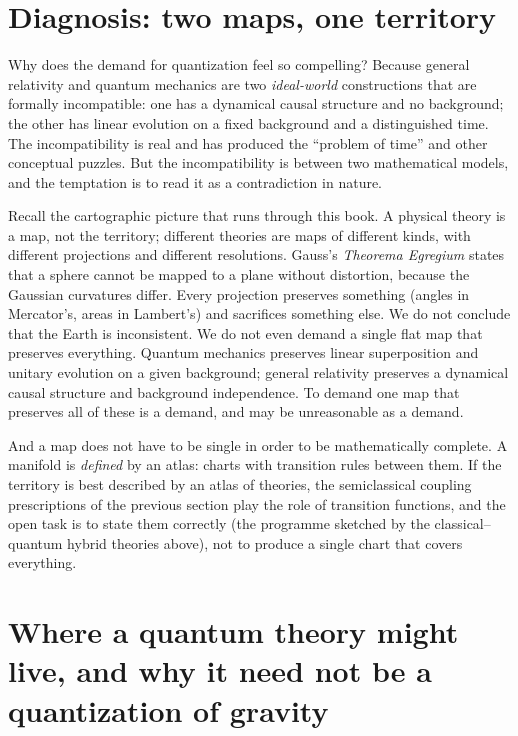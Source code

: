\section{Diagnosis: two maps, one territory}
\label{sec:maps}

Why does the demand for quantization feel so compelling? Because
general relativity and quantum mechanics are two \emph{ideal-world}
constructions that are formally incompatible: one has a dynamical
causal structure and no background; the other has linear evolution on a
fixed background and a distinguished time. The incompatibility is real
and has produced the ``problem of time'' and other conceptual puzzles.
But the incompatibility is between two mathematical models, and the
temptation is to read it as a contradiction in nature.

Recall the cartographic picture that runs through this book. A physical
theory is a map, not the territory; different theories are maps of
different kinds, with different projections and different resolutions.
Gauss's \emph{Theorema Egregium} states that a sphere cannot be mapped to
a plane without distortion, because the Gaussian curvatures differ.
Every projection preserves something (angles in Mercator's, areas in
Lambert's) and sacrifices something else. We do not conclude that the Earth
is inconsistent. We do not even demand a single flat map that preserves
everything. Quantum mechanics preserves linear superposition and
unitary evolution on a given background; general relativity preserves a
dynamical causal structure and background independence. To demand one map
that preserves all of these is a demand, and may be unreasonable as a
demand.

And a map does not have to be single in order to be mathematically
complete. A manifold is \emph{defined} by an atlas: charts with
transition rules between them. If the territory is best described by an
atlas of theories, the semiclassical coupling prescriptions of the previous
section play the role of transition functions, and the open task is to
state them correctly (the programme sketched by the classical--quantum
hybrid theories above), not to produce a single chart that covers
everything.

\section{Where a quantum theory might live, and why it need not be a
quantization of gravity}
\label{sec:emergent}

